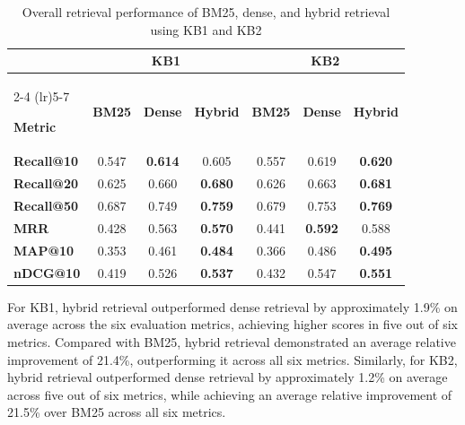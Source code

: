 \begin{table}[htbp]
    \centering
    \caption{Overall retrieval performance of BM25, dense, and hybrid retrieval using KB1 and KB2}
    \label{tab:overall_retrieval_performance}

    \small
    \renewcommand{\arraystretch}{1.4}
    \setlength{\tabcolsep}{5pt}

    \begin{tabular}{l ccc ccc}
        \toprule
        & \multicolumn{3}{c}{\textbf{KB1}}
        & \multicolumn{3}{c}{\textbf{KB2}} \\
        \cmidrule(lr){2-4}
        \cmidrule(lr){5-7}

        \textbf{Metric} &
        \textbf{BM25} &
        \textbf{Dense} &
        \textbf{Hybrid} &
        \textbf{BM25} &
        \textbf{Dense} &
        \textbf{Hybrid} \\
        \midrule

        \textbf{Recall@10} &
        0.547 & \textbf{0.614} & 0.605 &
        0.557 & 0.619 & \textbf{0.620} \\

        \textbf{Recall@20} &
        0.625 & 0.660 & \textbf{0.680} &
        0.626 & 0.663 & \textbf{0.681} \\

        \textbf{Recall@50} &
        0.687 & 0.749 & \textbf{0.759} &
        0.679 & 0.753 & \textbf{0.769} \\

        \textbf{MRR} &
        0.428 & 0.563 & \textbf{0.570} &
        0.441 & \textbf{0.592} & 0.588 \\

        \textbf{MAP@10} &
        0.353 & 0.461 & \textbf{0.484} &
        0.366 & 0.486 & \textbf{0.495} \\

        \textbf{nDCG@10} &
        0.419 & 0.526 & \textbf{0.537} &
        0.432 & 0.547 & \textbf{0.551} \\

        \bottomrule
    \end{tabular}
\end{table}

For KB1, hybrid retrieval outperformed dense retrieval by approximately 1.9\% on average across the six evaluation metrics, achieving higher scores in five out of six metrics. Compared with BM25, hybrid retrieval demonstrated an average relative improvement of 21.4\%, outperforming it across all six metrics. Similarly, for KB2, hybrid retrieval outperformed dense retrieval by approximately 1.2\% on average across five out of six metrics, while achieving an average relative improvement of 21.5\% over BM25 across all six metrics.

